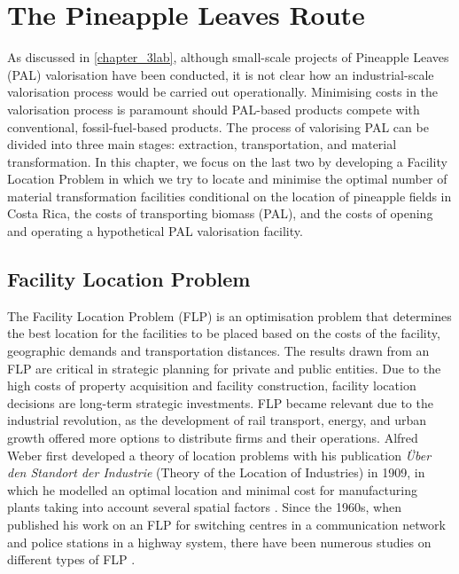 \chapter{The Pineapple Leaves Route}
\label{FLPchapt4}

As discussed in \cref{chapter_3lab}, although small-scale projects of Pineapple Leaves (PAL) valorisation have been conducted, it is not clear how an industrial-scale valorisation process would be carried out operationally. Minimising costs in the valorisation process is paramount should PAL-based products compete with conventional, fossil-fuel-based products. The process of valorising PAL can be divided into three main stages: extraction, transportation, and material transformation. In this chapter, we focus on the last two by developing a Facility Location Problem in which we try to locate and minimise the optimal number of material transformation facilities conditional on the location of pineapple fields in Costa Rica, the costs of transporting biomass (PAL), and the costs of opening and operating a hypothetical PAL valorisation facility.

\section{Facility Location Problem}
\label{FLPlit}

The Facility Location Problem (FLP) is an optimisation problem that determines the best location for the facilities to be placed based on the costs of the facility, geographic demands and transportation distances. The results drawn from an FLP are critical in strategic planning for private and public entities. Due to the high costs of property acquisition and facility construction, facility location decisions are long-term strategic investments. FLP became relevant due to the industrial revolution, as the development of rail transport, energy, and urban growth offered more options to distribute firms and their operations. Alfred Weber first developed a theory of location problems with his publication \textit{Über den Standort der Industrie} (Theory of the Location of Industries) in 1909, in which he modelled an optimal location and minimal cost for manufacturing plants taking into account several spatial factors \citep{fearon2006alfred}. Since the 1960s, when \citeauthor{hakimi1964optimum} published his work on an FLP for switching centres in a communication network and police stations in a highway system, there have been numerous studies on different types of FLP \citep{farahani2009facility}.

